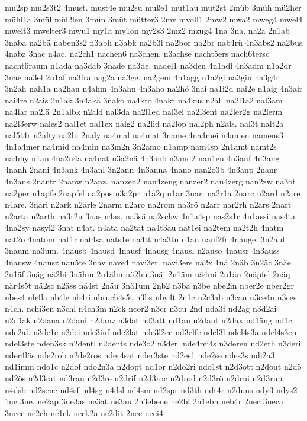 {mu2sp
mu2s3t2
4must.
must4e
mu2su
muße1
mut1au
mut2st
2müb
3müh
mü2her
mühl1a
3mül
mül2len
3mün
3müt
mütter3
2mv
mvoll1
2mw2
mwa2
mweg4
mwel4
mwelt3
mwelter3
mwu1
my1a
my1on
my2s3
2mz2
mzug4
1na
3na.
na2a
2n1ab
3naba
na2bä
naben3s2
n3abh
n3abk
na2b3l
na2bor
na2br
nab4rü
4n3abs2
na2bus
4nabz
3nac
n4ac.
na2ch1
nachen6
na3chen.
n3achse
nacht5ers
nach6tersc
nacht6raum
n1ada
na3dab
3nade
na3de.
nadel1
na3den
4n1adl
4n3adm
n1a2dr
3nae
na3el
2n1af
na3fra
nag2a
na3ge.
na2gem
4n1agg
n1a2gi
na3gin
na3g4r
3n2ah
nah1a
na2hau
n4ahm
4n3ahn
4n3aho
na2hö
3nai
na1i2d
nai2e
n1aig
4n3air
nai4re
n2ais
2n1ak
3n4akä
3nako
na4kro
4nakt
na4kus
n2al.
na2l1a2
nal3am
na4lar
na2lä
2n1albk
n2ald
nal3da
na2l1ed
nal3ei
na2l3ent
na2ler2g
na2lerm
na2l3erw
nales2
nal1et
nal1ex
nalg2
na2lid
na2lop
nal2ph
n2als.
nal3t
nalt2a
nal5t4r
n2alty
na2lu
2naly
na4mal
na4mat
3name
4na4mei
n4amen
namens3
4n1a4mer
na4mid
na4min
na3m2n
3n2amo
n1amp
nam4sp
2n1amt
namt2s
na4my
n1an
4na2n4a
na4nat
n3a2nä
4n3anb
n3and2
nan1eu
4n3anf
4n3ang
4nanh
2nani
4n3ank
4n3anl
3n2ann
4n3anna
4nano
nan2o3b
4n3anp
2nanr
4n3ans
2nantr
2nanw
n2anz.
nanzen2
nan4zeng
nanzer2
nan4zerg
nan2zw
na3ot
na2per
n1apfe
2napfel
na2pos
n3a2pr
n1a2q
n1ar
3nar.
na2r1a
2narc
n2ard
n2are
n4are.
3nari
n2ark
n2arle
2narm
n2aro
na2rom
na3rö
n2arr
nar2rh
n2ars
2nart
n2arta
n2arth
na3r2u
3nas
n4as.
na3sä
na2schw
4n1a4sp
nas2s1c
4n1assi
nas4ta
4na2sy
nasyl2
3nat
n4at.
n4ata
na2tat
na4t3au
nat1ei
na2tem
na2t2h
4natm
nat2o
4natom
nat1r
nat4sa
nats1e
na4tt
n4a3tu
n1au
nauf2fr
4nauge.
3n2aul
3naum
na3um.
4nausb
4nausd
4nausf
4nausg
4nausl
n2auso
4nausr
4n3auss
4nausw
4nausz
nau5te
3nav
nave4
navi3er.
navi3ers
na2x
1nä
2näb
3n2äc
3näe
2n1äf
3näg
nä2hi
3nähm
2n1ähn
nä2hu
3näi
2n1äm
nä4mi
2n1än
2näpfel
2näq
när4s5t
nä2sc
n2äss
nä4st
2näu
3nä1um
2nb2
n3ba
n3be
nbe2in
nber2e
nber2gr
nbes4
nb4la
nb4le
nb4ri
nbruch4s5t
n3bs
nby4t
2n1c
n2c3ab
n3can
n3ce4n
n3ces.
n4ch.
nchi3en
n3chl
n4ch3m
n2ck
ncor2
n3cr
n3cu
2nd
nda3f
nd2ag
n3d2ai
n2d1ak
n2dana
n2dani
n2danz
n3dat
nd3att
nd1au
n2daut
n2dax
nd1äng
nd1c
nde2al.
n3de1e
n2dei
nde3inf
nde2lat
nde3l2ec
nd3elfe
ndel3l
ndel4s3a
ndel4s3en
ndel3ste
nden3sk
n2dentl
n2dents
nde3o2
n3der.
nde4rei4s
n3deren
nd2erh
n3deri
nder4läs
nde2rob
n2de2ros
nder4sat
nder3ste
nd2es1
nde2se
ndes3s
ndi2a3
nd1imm
ndo1c
n2dof
ndo2n3a
n2dopt
nd1or
n2do2ri
ndo1st
n2d3ott
n2dout
n2dö
nd2ös
n2d3rat
nd3rau
n2d3re
n2drif
n2d3roc
n2drod
n2d3rö
n2drui
n2d3run
n4dsb
nd2sene
nd4sf
nd4sg
n4dsl
nd4sm
nd2spr
nd3th
ndt4r
n2duns
ndy3
ndys2
1ne
3ne.
ne2ap
3ne3as
ne3at
ne3au
2n3ebene
ne2bl
2n1ebn
neb4r
2nec
3neca
3nece
ne2ch
ne1ck
neck2a
ne2dit
2nee
neei4
}
